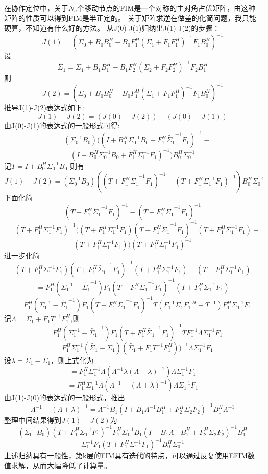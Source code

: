\documentclass[12pt]{article}
\providecommand{\DIFaddtex}[1]{{\protect\color{blue}\uwave{#1}}} %
\providecommand{\DIFaddbegin}{} %
\providecommand{\DIFaddend}{} %
\providecommand{\DIFadd}[1]{\texorpdfstring{\DIFaddtex{#1}}{#1}} %
\newcommand{\DIFaddincludegraphics}[2][]{{\color{blue}\fbox{\DIFOincludegraphics[#1]{#2}}}} %
\DeclareRobustCommand{\DIFaddbegin}{\DIFOaddbegin \let\includegraphics\DIFaddincludegraphics} %
\DeclareRobustCommand{\DIFaddend}{\DIFOaddend \let\includegraphics\DIFOincludegraphics} %
\begin{document}
\title{\textbf{}} 

\author{}
\maketitle
\large
\DIFaddbegin \DIFadd{add some new line here
}\DIFaddend 在协作定位中，关于$N_a$个移动节点的FIM是一个对称的主对角占优矩阵，由这种矩阵的性质可以得到FIM是半正定的。
关于矩阵求逆在做差的化简问题，我只能硬算，不知道有什么好的方法。
从J(0)-J(1)归纳出J(1)-J(2)的步骤：
\[
J(1)=(\Sigma_0+B_0B_0^H-B_0F_1^H
(\Sigma_1+F_1F_1^H)^{-1}F_1B_0^H)^{-1}
\]
设
\[
\tilde{\Sigma_1}=\Sigma_1+B_1B_1^H-B_1F_2^H
(\Sigma_2+F_2F_2^H)^{-1}F_2B_1^H
\]
则
\[
J(2)=(\Sigma_0+B_0B_0^H-B_0F_1^H
(\tilde{\Sigma_1}+F_1F_1^H)^{-1}F_1B_0^H)^{-1}
\]
推导J(1)-J(2)表达式如下:
\[
J(1)-J(2)=(J(0)-J(2))-(J(0)-J(1))
\]
由J(0)-J(1)的表达式的一般形式可得:
\[
=(\Sigma_0^{-1}B_0)((I+B_0^H\Sigma_0^{-1}B_0+F_1^H\tilde{\Sigma_1}^{-1}F_1)^{-1}-
\]
\[
(I+B_0^H\Sigma_0^{-1}B_0+F_1^H\Sigma_1^{-1}F_1)^{-1})B_0^H\Sigma_0^{-1}
\]
记$T=I+B_0^H\Sigma_0^{-1}B_0$
则有
\[
J(1)-J(2)=(\Sigma_0^{-1}B_0)((T+F_1^H\tilde{\Sigma_1}^{-1}F_1)^{-1}-(T+F_1^H\Sigma_1^{-1}F_1)^{-1})B_0^H\Sigma_0^{-1}
\]
下面化简
\[
(T+F_1^H\tilde{\Sigma_1}^{-1}F_1)^{-1}-(T+F_1^H\tilde{\Sigma_1}^{-1}F_1)^{-1}
\]
\[
=(T+F_1^H\Sigma_1^{-1}F_1)^{-1}((T+F_1^H\Sigma_1^{-1}F_1)(T+F_1^H\tilde{\Sigma_1}^{-1}F_1)^{-1}
(T+F_1^H\Sigma_1^{-1}F_1)-
\]
\[
(T+F_1^H\Sigma_1^{-1}F_1))(T+F_1^H\Sigma_1^{-1}F_1)^{-1}
\]
进一步化简
\[
(T+F_1^H\Sigma_1^{-1}F_1)(T+F_1^H\tilde{\Sigma_1}^{-1}F_1)^{-1}
(T+F_1^H\Sigma_1^{-1}F_1)-(T+F_1^H\Sigma_1^{-1}F_1)
\]
\[
=F_1^H(\Sigma_1^{-1}-\tilde{\Sigma_1}^{-1})F_1(T+F_1^H\tilde{\Sigma_1}^{-1}F_1)^{-1}(T+F_1^H\Sigma_1^{-1}F_1)
\]
\[
=F_1^H(\Sigma_1^{-1}-\tilde{\Sigma_1}^{-1})F_1(T+F_1^H\tilde{\Sigma_1}^{-1}F_1)^{-1}T(F_1^{-1}\Sigma_1F_1^{-H}+T^{-1})F_1^H\Sigma_1^{-1}F_1
\]
记$\Lambda=\Sigma_1+F_1T^{-1}F_1^H$,则
\[
=F_1^H(\Sigma_1^{-1}-\tilde{\Sigma_1}^{-1})F_1(T+F_1^H\tilde{\Sigma_1}^{-1}F_1)^{-1}TF_1^{-1}\Lambda\Sigma_1^{-1}F_1
\]
\[
=F_1^H\Sigma_1^{-1}(\tilde{\Sigma_1}-\Sigma_1)(\tilde{\Sigma_1}+F_1T^{-1}F_1^H))^{-1}\Lambda\Sigma_1^{-1}F_1
\]
设$\lambda=\tilde{\Sigma_1}-\Sigma_1$，则上式化为
\[
=F_1^H\Sigma_1^{-1}\Lambda(\Lambda^{-1}\lambda(\Lambda+\lambda)^{-1})\Lambda\Sigma_1^{-1}F_1
\]
\[
=F_1^H\Sigma_1^{-1}\Lambda(\Lambda^{-1}-(\Lambda+\lambda)^{-1})\Lambda\Sigma_1^{-1}F_1
\]
由J(1)-J(0)的表达式的一般形式，推出
\[
\Lambda^{-1}-(\Lambda+\lambda)^{-1}=\Lambda^{-1}B_1(I+B_1\Lambda^{-1}B_1^H+F_2^H\Sigma_2F_2)^{-1}B_1^H\Lambda^{-1}
\]
整理中间结果得到$J(1)-J(2)$为
\[
(\Sigma_0^{-1}B_0)(T+F_1^H\Sigma_1^{-1}F_1)^{-1}F_1^H\Sigma_1^{-1}B_1(I+B_1\Lambda^{-1}B_1^H+F_2^H\Sigma_2F_2)^{-1}B_1^H
\]
\[
\Sigma_1^{-1}F_1(T+F_1^H\Sigma_1^{-1}F_1)^{-1}B_0^H\Sigma_0^{-1}
\]
上述归纳具有一般性，第k层的FIM具有迭代的特点，可以通过反复使用EFIM数值求解，从而大幅降低了计算量。
\end{document}
